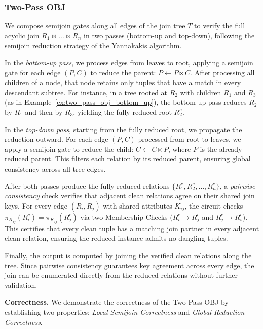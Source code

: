 \documentclass[sigconf]{acmart}
\renewcommand{\emph}[1]{\textit{#1}}
\begin{document}
\subsubsection{Two-Pass OBJ}
\label{subsubsec:two_pass}
We compose semijoin gates along all edges of the join tree $T$ to verify the full acyclic join $R_1 \bowtie \dots \bowtie R_n$ in two passes (bottom-up and top-down), following the semijoin reduction strategy of the Yannakakis algorithm.

In the \emph{bottom-up pass}, we process edges from leaves to root, applying a semijoin gate for each edge $(P, C)$ to reduce the parent: $P \leftarrow P \ltimes C$. After processing all children of a node, that node retains only tuples that have a match in every descendant subtree. For instance, in a tree rooted at $R_2$ with children $R_1$ and $R_3$ (as in Example~\ref{ex:two_pass_obj_bottom_up}), the bottom-up pass reduces $R_2$ by $R_1$ and then by $R_3$, yielding the fully reduced root $R_2^c$.

In the \emph{top-down pass}, starting from the fully reduced root, we propagate the reduction outward. For each edge $(P, C)$ processed from root to leaves, we apply a semijoin gate to reduce the child: $C \leftarrow C \ltimes P$, where $P$ is the already-reduced parent. This filters each relation by its reduced parent, ensuring global consistency across all tree edges.

After both passes produce the fully reduced relations $\{R_1^c, R_2^c, \dots, R_n^c\}$, a \emph{pairwise consistency} check verifies that adjacent clean relations agree on their shared join keys. For every edge $(R_i, R_j)$ with shared attributes $K_{ij}$, the circuit checks $\pi_{K_{ij}}(R_i^c) = \pi_{K_{ij}}(R_j^c)$ via two Membership Checks ($R_i^c \to R_j^c$ and $R_j^c \to R_i^c$). This certifies that every clean tuple has a matching join partner in every adjacent clean relation, ensuring the reduced instance admits no dangling tuples.

Finally, the output is computed by joining the verified clean relations along the tree. Since pairwise consistency guarantees key agreement across every edge, the join can be enumerated directly from the reduced relations without further validation.


\noindent\textbf{Correctness.}
We demonstrate the correctness of the Two-Pass OBJ by establishing two properties: \emph{Local Semijoin Correctness} and \emph{Global Reduction Correctness}.
\end{document}
